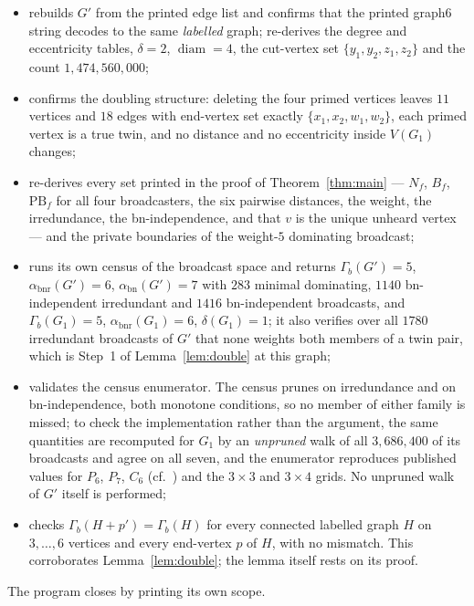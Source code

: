 \documentclass[11pt]{amsart}
\theoremstyle{remark}
\DeclareMathOperator{\bnr}{bnr}
\DeclareMathOperator{\bn}{bn}
\newcommand{\abnr}{\alpha_{\bnr}}
\newcommand{\abn}{\alpha_{\bn}}
\newcommand{\Gb}{\Gamma_{b}}
\newcommand{\Gp}{G'}
\newcommand{\PB}{\mathrm{PB}}
\begin{document}
\begin{itemize}
\item rebuilds $\Gp$ from the printed edge list and confirms that the printed
graph6 string decodes to the same \emph{labelled} graph; re-derives the degree
and eccentricity tables, $\delta=2$, $\operatorname{diam}=4$, the cut-vertex set
$\{y_1,y_2,z_1,z_2\}$ and the count $1{,}474{,}560{,}000$;
\item confirms the doubling structure: deleting the four primed vertices leaves
$11$ vertices and $18$ edges with end-vertex set exactly $\{x_1,x_2,w_1,w_2\}$,
each primed vertex is a true twin, and no distance and no eccentricity inside
$V(G_1)$ changes;
\item re-derives every set printed in the proof of Theorem~\ref{thm:main} ---
$N_f$, $B_f$, $\PB_f$ for all four broadcasters, the six pairwise distances, the
weight, the irredundance, the bn-independence, and that $v$ is the unique
unheard vertex --- and the private boundaries of the weight-$5$ dominating
broadcast;
\item runs its own census of the broadcast space and returns
$\Gb(\Gp)=5$, $\abnr(\Gp)=6$, $\abn(\Gp)=7$ with $283$ minimal dominating,
$1140$ bn-independent irredundant and $1416$ bn-independent broadcasts, and
$\Gb(G_1)=5$, $\abnr(G_1)=6$, $\delta(G_1)=1$; it also verifies over all $1780$
irredundant broadcasts of $\Gp$ that none weights both members of a twin pair,
which is Step~1 of Lemma~\ref{lem:double} at this graph;
\item validates the census enumerator. The census prunes on irredundance and on
bn-independence, both monotone conditions, so no member of either family is
missed; to check the implementation rather than the argument, the same quantities
are recomputed for $G_1$ by an \emph{unpruned} walk of all $3{,}686{,}400$ of
its broadcasts and agree on all seven, and the enumerator reproduces published
values for $P_6$, $P_7$, $C_6$ (cf.\ \cite{BBS20}) and the $3\times3$ and
$3\times4$ grids. No unpruned walk of $\Gp$ itself is performed;
\item checks $\Gb(H+p')=\Gb(H)$ for every connected labelled graph $H$ on
$3,\ldots,6$ vertices and every end-vertex $p$ of $H$, with no mismatch. This
corroborates Lemma~\ref{lem:double}; the lemma itself rests on its proof.
\end{itemize}

\noindent
The program closes by printing its own scope.
\end{document}
